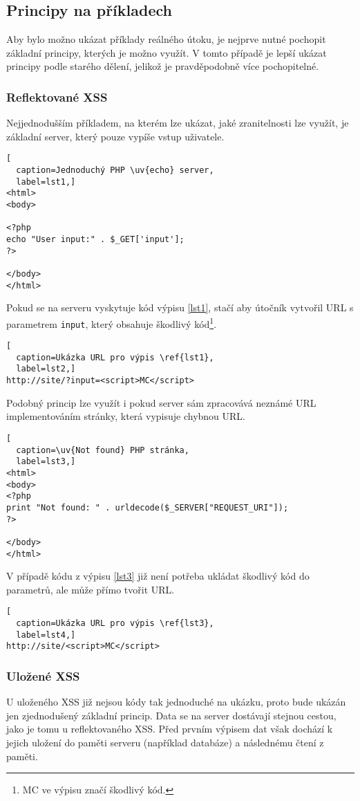 \documentclass[11pt, conference, a4paper]{IEEEtran}
\begin{document}
\subsection{Principy na příkladech}
Aby bylo možno ukázat příklady reálného útoku, je nejprve nutné pochopit základní principy, kterých je možno využít. V tomto případě je lepší ukázat principy podle starého dělení, jelikož je pravděpodobně více pochopitelné.

\subsubsection{Reflektované XSS}
Nejjednodušším příkladem, na kterém lze ukázat, jaké zranitelnosti lze využít, je základní  server, který pouze vypíše vstup uživatele.

\begin{lstlisting}[
  caption=Jednoduchý PHP \uv{echo} server,
  label=lst1,]
<html>
<body>

<?php
echo "User input:" . $_GET['input'];
?>

</body>
</html>
\end{lstlisting}

Pokud se na serveru vyskytuje kód výpisu \ref{lst1}, stačí aby útočník vytvořil URL s parametrem \texttt{input}, který obsahuje škodlivý kód\footnote{MC ve výpisu značí škodlivý kód.}. 
\begin{lstlisting}[
  caption=Ukázka URL pro výpis \ref{lst1},
  label=lst2,]
http://site/?input=<script>MC</script>
\end{lstlisting}

Podobný princip lze využít i pokud server sám zpracovává neznámé URL implementováním  stránky, která vypisuje chybnou URL.

\begin{lstlisting}[
  caption=\uv{Not found} PHP stránka,
  label=lst3,]
<html>
<body>
<?php
print "Not found: " . urldecode($_SERVER["REQUEST_URI"]);
?>

</body>
</html>
\end{lstlisting}

V případě kódu z výpisu \ref{lst3} již není potřeba ukládat škodlivý kód do parametrů, ale může přímo tvořit URL.

\begin{lstlisting}[
  caption=Ukázka URL pro výpis \ref{lst3},
  label=lst4,]
http://site/<script>MC</script>
\end{lstlisting}

\subsubsection{Uložené XSS}
U uloženého XSS již nejsou kódy tak jednoduché na ukázku, proto bude ukázán jen zjednodušený základní princip. Data se na server dostávají stejnou cestou, jako je tomu u reflektovaného XSS. Před prvním výpisem dat však dochází k jejich uložení do paměti serveru (například databáze) a následnému čtení z paměti.
\end{document}
